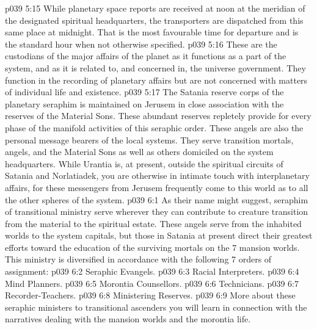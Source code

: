 \vs p039 5:15 \pc While planetary space reports are received at noon at the meridian of the designated spiritual headquarters, the transporters are dispatched from this same place at midnight. That is the most favourable time for departure and is the standard hour when not otherwise specified.
\vs p039 5:16 \bibnobreakspace {} These are the custodians of the major affairs of the planet as it functions as a part of the system, and as it is related to, and concerned in, the universe government. They function in the recording of planetary affairs but are not concerned with matters of individual life and existence.
\vs p039 5:17 \bibnobreakspace {} The Satania reserve corps of the planetary seraphim is maintained on Jerusem in close association with the reserves of the Material Sons. These abundant reserves repletely provide for every phase of the manifold activities of this seraphic order. These angels are also the personal message bearers of the local systems. They serve transition mortals, angels, and the Material Sons as well as others domiciled on the system headquarters. While Urantia is, at present, outside the spiritual circuits of Satania and Norlatiadek, you are otherwise in intimate touch with interplanetary affairs, for these messengers from Jerusem frequently come to this world as to all the other spheres of the system.
\vs p039 6:1 As their name might suggest, seraphim of transitional ministry serve wherever they can contribute to creature transition from the material to the spiritual estate. These angels serve from the inhabited worlds to the system capitals, but those in Satania at present direct their greatest efforts toward the education of the surviving mortals on the 7 mansion worlds. This ministry is diversified in accordance with the following 7 orders of assignment:
\vs p039 6:2 \bibnobreakspace Seraphic Evangels.
\vs p039 6:3 \bibnobreakspace Racial Interpreters.
\vs p039 6:4 \bibnobreakspace Mind Planners.
\vs p039 6:5 \bibnobreakspace Morontia Counsellors.
\vs p039 6:6 \bibnobreakspace Technicians.
\vs p039 6:7 \bibnobreakspace Recorder\hyp{}Teachers.
\vs p039 6:8 \bibnobreakspace Ministering Reserves.
\vs p039 6:9 \pc More about these seraphic ministers to transitional ascenders you will learn in connection with the narratives dealing with the mansion worlds and the morontia life.
